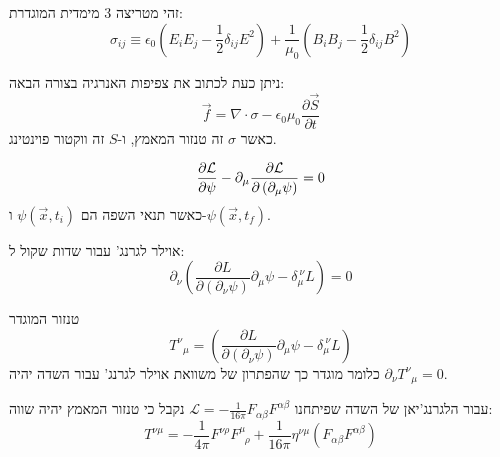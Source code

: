 \documentclass{tstextbook}
\begin{document}
\begin{definition}
זהי מטריצה 3 מימדית המוגדרת:
$$\sigma_{i j}\equiv\epsilon_{0}\left(E_{i}E_{j}-\frac{1}{2}\delta_{i j}E^{2}\right)+\frac{1}{\mu_{0}}\left(B_{i}B_{j}-\frac{1}{2}\delta_{i j}B^{2}\right)$$

\end{definition}
\begin{proposition}
ניתן כעת לכתוב את צפיפות האנרגיה בצורה הבאה:
$${\vec f}=\nabla\cdot \sigma-\epsilon_{0}\mu_{0}\frac{\partial{\vec S}}{\partial t}$$
כאשר \(\sigma\) זה טנזור המאמץ, ו-\(S\) זה ווקטור פוינטינג.

\end{proposition}
\begin{proposition}
$$\frac{\partial{\cal L}}{\partial\psi}-\partial_{\mu}\frac{\partial{\cal L}}{\partial\left(\partial_{\mu}\psi\right)}=0$$
כאשר תנאי השפה הם \(\psi\left( \vec{x},t_{i} \right)\) ו-\(\psi\left( \vec{x},t_{f} \right)\).

\end{proposition}
\begin{proposition}
אוילר לגרנג' עבור שדות שקול ל:
$$\partial_{\nu}{ \left(\frac{\partial L}{\partial\left(\partial_{\nu}\psi\right)}\partial_{\mu}\psi-\delta_{\mu}^{~\nu}L\right) }=0$$

\end{proposition}
\begin{definition}
טנזור המוגדר
$${T^{\nu}}_{\mu}=\left(\frac{\partial L}{\partial\left(\partial_{\nu}\psi\right)}\partial_{\mu}\psi-\delta_{\mu}^{~\nu}L\right)$$
כלומר מוגדר כך שהפתרון של משוואת אוילר לגרנג' עבור השדה יהיה \(\partial_{\nu}{T^{\nu}}_{\mu}=0\).

\end{definition}
\begin{proposition}
עבור הלגרנג'יאן של השדה שפיתחנו \(\mathcal{L}=-\frac{1}{16\pi}F_{\alpha \beta}F^{\alpha \beta}\) נקבל כי טנזור המאמץ יהיה שווה:
$$T^{\nu\mu}=-\frac{1}{4\pi}F^{\nu\rho}F_{\;\;\rho}^{\mu}+\frac{1}{16\pi}\eta^{\nu\mu}\left(F_{\alpha\beta}F^{\alpha\beta}\right)$$

\end{proposition}
\end{document}
